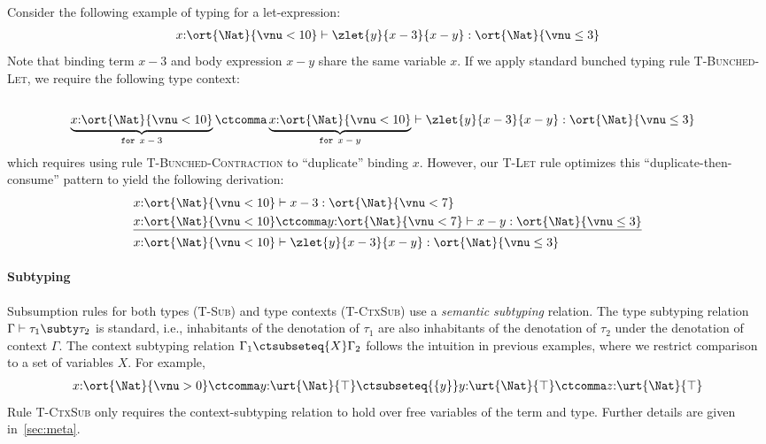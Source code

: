 \begin{example} Consider the following example of typing for a let-expression:
\begin{align*}
    x{:}\ort{\Nat}{\vnu < 10} \vdash \zlet{y}{x - 3}{x - y} : \ort{\Nat}{\vnu \leq 3}
\end{align*}\noindent
Note that binding term $x - 3$ and body expression $x - y$ share the same variable $x$. If we apply standard bunched typing rule \textsc{T-Bunched-Let}, we require the following type context:
\begin{align*}
  \\&\underbrace{x{:}\ort{\Nat}{\vnu < 10}}_{\texttt{for $x - 3$}} \ctcomma \underbrace{x{:}\ort{\Nat}{\vnu < 10}}_{\texttt{for $x - y$}} \vdash \zlet{y}{x - 3}{x - y} : \ort{\Nat}{\vnu \leq 3}
\end{align*}\noindent
which requires using rule \textsc{T-Bunched-Contraction} to ``duplicate'' binding $x$. However, our \textsc{T-Let} rule optimizes this ``duplicate-then-consume'' pattern to yield the following derivation:
\begin{align*}
  &x{:}\ort{\Nat}{\vnu < 10} \vdash x - 3 : \ort{\Nat}{\vnu < 7}
  \\&\underline{x{:}\ort{\Nat}{\vnu < 10} \ctcomma y{:}\ort{\Nat}{\vnu < 7} \vdash x - y : \ort{\Nat}{\vnu \leq 3}}
  \\&x{:}\ort{\Nat}{\vnu < 10} \vdash \zlet{y}{x - 3}{x - y} : \ort{\Nat}{\vnu \leq 3}
\end{align*}\noindent
\end{example}

\paragraph{Subtyping}  Subsumption rules for both types (\textsc{T-Sub}) and
type contexts (\textsc{T-CtxSub}) use a \emph{semantic
  subtyping} relation. The type subtyping relation $\Gamma
\vdash\tau_1 \subty \tau_2$ is standard, i.e., inhabitants of the
denotation of $\tau_1$ are also inhabitants of the denotation of
$\tau_2$ under the denotation of context $\Gamma$. The context
subtyping relation $\Gamma_1 \ctsubseteq{X} \Gamma_2$ follows the
intuition in previous examples, where we restrict comparison to a set
of variables $X$.  For example,
\begin{align*}
  x{:}\ort{\Nat}{\vnu > 0} \ctcomma y{:}\urt{\Nat}{\top}
  \ctsubseteq{\{y\}} y{:}\urt{\Nat}{\top} \ctcomma z{:}\urt{\Nat}{\top}
\end{align*}
Rule \textsc{T-CtxSub} only requires the context-subtyping relation
to hold over free variables of the term and type. Further details are
given in~\autoref{sec:meta}.

